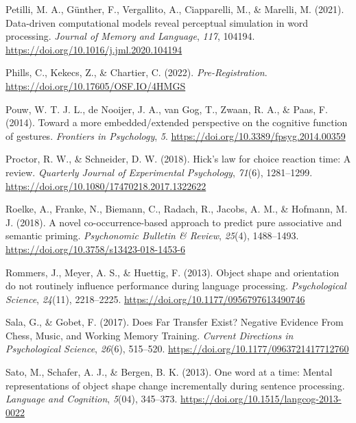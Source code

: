 \documentclass[
  man,floatsintext]{apa7}
\newlength{\cslhangindent}
\newlength{\cslentryspacingunit} %
\newenvironment{CSLReferences}[2] %
 {%
  \setlength{\parindent}{0pt}
  \ifodd #1
  \let\oldpar\par
  \def\par{\hangindent=\cslhangindent\oldpar}
  \fi
  \setlength{\parskip}{#2\cslentryspacingunit}
 }%
 {}
\begin{document}
\begin{CSLReferences}{1}{0}
\leavevmode{}%
Petilli, M. A., Günther, F., Vergallito, A., Ciapparelli, M., \& Marelli, M. (2021). Data-driven computational models reveal perceptual simulation in word processing. \emph{Journal of Memory and Language}, \emph{117}, 104194. \url{https://doi.org/10.1016/j.jml.2020.104194}

\leavevmode{}%
Phills, C., Kekecs, Z., \& Chartier, C. (2022). \emph{Pre-{Registration}}. \url{https://doi.org/10.17605/OSF.IO/4HMGS}

\leavevmode{}%
Pouw, W. T. J. L., de Nooijer, J. A., van Gog, T., Zwaan, R. A., \& Paas, F. (2014). Toward a more embedded/extended perspective on the cognitive function of gestures. \emph{Frontiers in Psychology}, \emph{5}. \url{https://doi.org/10.3389/fpsyg.2014.00359}

\leavevmode{}%
Proctor, R. W., \& Schneider, D. W. (2018). Hick's law for choice reaction time: {A} review. \emph{Quarterly Journal of Experimental Psychology}, \emph{71}(6), 1281--1299. \url{https://doi.org/10.1080/17470218.2017.1322622}

\leavevmode{}%
Roelke, A., Franke, N., Biemann, C., Radach, R., Jacobs, A. M., \& Hofmann, M. J. (2018). A novel co-occurrence-based approach to predict pure associative and semantic priming. \emph{Psychonomic Bulletin \& Review}, \emph{25}(4), 1488--1493. \url{https://doi.org/10.3758/s13423-018-1453-6}

\leavevmode{}%
Rommers, J., Meyer, A. S., \& Huettig, F. (2013). Object shape and orientation do not routinely influence performance during language processing. \emph{Psychological Science}, \emph{24}(11), 2218--2225. \url{https://doi.org/10.1177/0956797613490746}

\leavevmode{}%
Sala, G., \& Gobet, F. (2017). Does Far Transfer Exist? Negative Evidence From Chess, Music, and Working Memory Training. \emph{Current Directions in Psychological Science}, \emph{26}(6), 515--520. \url{https://doi.org/10.1177/0963721417712760}

\leavevmode{}%
Sato, M., Schafer, A. J., \& Bergen, B. K. (2013). One word at a time: {Mental} representations of object shape change incrementally during sentence processing. \emph{Language and Cognition}, \emph{5}(04), 345--373. \url{https://doi.org/10.1515/langcog-2013-0022}


\end{CSLReferences}
\end{document}
